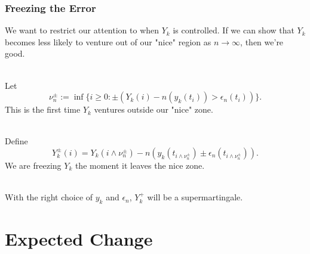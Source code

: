 \documentclass{beamer}
\begin{document}
\begin{frame}
\frametitle{Freezing the Error}

We want to restrict our attention to when \(Y_{k}\) is controlled. \pause If we can show that \(Y_{k}\) becomes less likely to venture out of our "nice" region as \(n \to \infty\), then we're good. \\~\

\pause
Let 
\[\nu_{n}^{\pm} := \inf\limits \{i \geq 0 : \pm (Y_{k}(i) - n(y_{k}(t_{i})) > \epsilon_{n}(t_{i}))\}.\]
This is the first time \(Y_{k}\) ventures outside our "nice" zone.\\~\

\pause
Define
\[Y_{k}^{\pm}(i) = Y_{k}(i \wedge \nu_{n}^{\pm}) - n(y_{k}(t_{i \wedge \nu_{n}^{\pm}}) \pm \epsilon_{n}(t_{i \wedge \nu_{n}^{\pm}})). \]
We are freezing \(Y_{k}\) the moment it leaves the nice zone. \\~\

\pause
With the right choice of \(y_{k}\) and \(\epsilon_{n}\), \(Y_{k}^{+}\) will be a supermartingale.

\end{frame}


\section{Expected Change}
\end{document}

